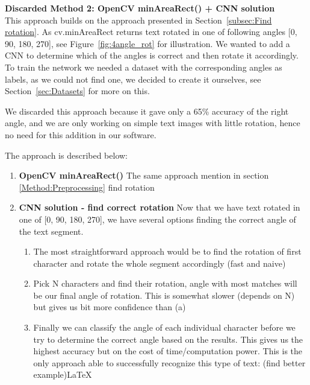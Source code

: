 \documentclass[Report.tex]{subfiles}
\begin{document}
\begin{flushleft}
  \textbf{Discarded Method 2: OpenCV minAreaRect() + CNN solution} \\
  This approach builds on the approach presented in Section~\ref{subsec:Find rotation}. As cv.minAreaRect returns text rotated in one of following angles [0\textdegree, 90\textdegree, 180\textdegree, 270\textdegree], see Figure~\ref{fig:4angle_rot} for illustration. We wanted to add a CNN to determine which of the angles is correct and then rotate it accordingly.
  To train the network we needed a dataset with the corresponding angles as labels, as we could not find one, we decided to create it ourselves, see Section~\ref{sec:Datasets} for more on this. \par
  We discarded this approach because it gave only a 65\% accuracy of the right angle, and we are only working on simple text images with little rotation, hence no need for this addition in our software. \par
  The approach is described below:
  \begin{enumerate}
    \item \textbf{OpenCV minAreaRect()}
    The same approach mention in section \ref{Method:Preprocessing} find rotation
    \item \textbf{CNN solution - find correct rotation}
    Now that we have text rotated in one of [0\textdegree, 90\textdegree, 180\textdegree, 270\textdegree], we have several options finding the correct angle of the text segment.
    \begin{enumerate}
      \item{The most straightforward approach would be to find the rotation of first character and rotate the whole segment accordingly (fast and naive)}
      \item{Pick N characters and find their rotation, angle with most matches will be our final angle of rotation. This is somewhat slower (depends on N) but gives us bit more confidence than (a)}
      \item{Finally we can classify the angle of each individual character before we try to determine the correct angle based on the results. This gives us the highest accuracy but on the cost of time/computation power. This is the only approach able to successfully recognize this type of text: (find better example)\LaTeX}
      \end{enumerate}
    \end{enumerate}



\end{flushleft}
\end{document}
